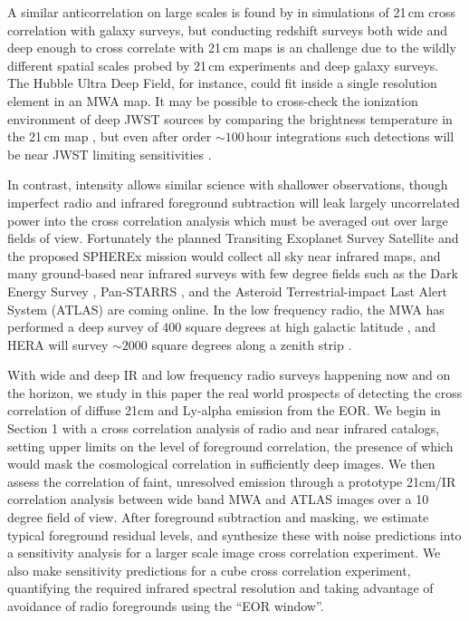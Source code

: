 \documentclass{emulateapj}
\begin{document}
A similar anticorrelation on large scales is found by \citet{lidz09,park14} in simulations of 21\,cm cross correlation with galaxy surveys, but conducting redshift surveys both wide and deep enough to cross correlate with 21\,cm maps is an  challenge due to the wildly different spatial scales probed by 21\,cm experiments and deep galaxy surveys. The Hubble Ultra Deep Field, for instance, could fit inside a single resolution element in an MWA map. It may be possible to cross-check the ionization environment of deep JWST sources by comparing the brightness temperature in the 21\,cm map \citep{beardsley15}, but even after order $\sim100$\,hour integrations such detections will be near JWST limiting sensitivities \citet{zackrisson11}.

In contrast, intensity allows similar science with shallower observations, though imperfect radio and infrared foreground subtraction will leak largely uncorrelated power into the cross correlation analysis which must be averaged out over large fields of view. Fortunately the planned Transiting Exoplanet Survey Satellite \citep{ricker14} and the proposed SPHEREx mission \citep{ScienceWithSpherex,SpherexWhitePaper} would collect all sky near infrared maps, and many ground-based near infrared surveys with few degree fields such as the Dark Energy Survey \citep{des16}, Pan-STARRS \citep{tonry12}, and the Asteroid Terrestrial-impact Last Alert System (ATLAS) \citep{tonry11} are coming online. In the low frequency radio, the MWA has performed a deep survey of 400 square degrees at high galactic latitude \citep{beardsley16}, and HERA will survey $\sim2000$ square degrees along a zenith strip \citep{dillonmapmaking}. 

With wide and deep IR and low frequency radio surveys happening now and on the horizon, we study in this paper the real world prospects of detecting the cross correlation of diffuse 21cm and Ly-alpha emission from the EOR. We begin in Section 1 with a cross correlation analysis of radio and near infrared catalogs, setting upper limits on the level of foreground correlation, the presence of which would mask the cosmological correlation in sufficiently deep images. We then assess the correlation of faint, unresolved emission through a prototype 21cm/IR correlation analysis between wide band MWA and ATLAS images over a 10 degree field of view. After foreground subtraction and masking, we estimate typical foreground residual levels, and synthesize these with noise predictions into a sensitivity analysis for a larger scale image cross correlation experiment. We also make sensitivity predictions for a cube cross correlation experiment, quantifying the required infrared spectral resolution and taking advantage of avoidance of radio foregrounds using the ``EOR window''.
\end{document}
